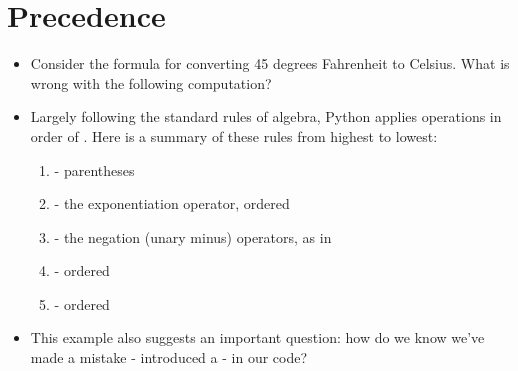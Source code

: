 \documentclass[letterpaper,10pt,english]{sphinxmanual}
\begin{document}
\section{Precedence}
\label{\detokenize{lecture_notes/lec02_calculator:precedence}}\begin{itemize}
\item {} 
Consider the formula for converting 45 degrees Fahrenheit to
Celsius. What is wrong with the following
computation?

\begin{sphinxVerbatim}[commandchars=\\\{\}]
      
\end{sphinxVerbatim}

\item {} 
Largely following the standard rules of algebra, Python applies
operations in order of .  Here is a
summary of these rules from highest to lowest:
\begin{enumerate}
\def\theenumi{\arabic{enumi}}
\def\labelenumi{\theenumi .}
\makeatletter\def\p@enumii{\p@enumi \theenumi .}\makeatother
\item {} 
\sphinxcode{\sphinxupquote{( )}} - parentheses

\item {} 
\sphinxcode{\sphinxupquote{**}} - the exponentiation operator, ordered 

\item {} 
\sphinxcode{\sphinxupquote{-}} - the negation (unary minus) operators, as in 

\item {} 
\sphinxcode{\sphinxupquote{*, /, //, \%}} - ordered 

\item {} 
\sphinxcode{\sphinxupquote{+, -}} - ordered 

\end{enumerate}

\item {} 
This example also suggests an important question:  how do we know
we’ve made a mistake - introduced a  - in our code?

\end{itemize}
\end{document}
